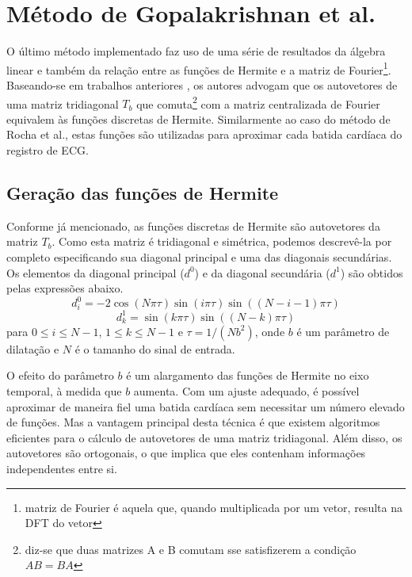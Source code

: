 
\section{Método de Gopalakrishnan et al.}
\label{sec:section4}
O último método implementado faz uso de uma série de resultados da álgebra linear e também da relação entre as funções de Hermite e a matriz de Fourier\footnote{matriz de Fourier é aquela que, quando multiplicada por um vetor, resulta na DFT do vetor}. Baseando-se em trabalhos anteriores \cite{Mugler02}, os autores advogam que os autovetores de uma matriz tridiagonal $T_b$ que comuta\footnote{diz-se que duas matrizes A e B comutam sse satisfizerem a condição $AB = BA$} com a matriz centralizada de Fourier equivalem às funções discretas de Hermite. Similarmente ao caso do método de Rocha et al., estas funções são utilizadas para aproximar cada batida cardíaca do registro de ECG.

\subsection{Geração das funções de Hermite}
Conforme já mencionado, as funções discretas de Hermite são autovetores da matriz $T_b$. Como esta matriz é tridiagonal e simétrica, podemos descrevê-la por completo especificando sua diagonal principal e uma das diagonais secundárias. Os elementos da diagonal principal ($d^0$) e da diagonal secundária ($d^1$) são obtidos pelas expressões abaixo.
\begin{equation} \label{equ:main_diagonal}
    d^0_{i} = -2\cos(N\pi\tau)\sin(i\pi\tau)\sin((N-i-1)\pi\tau)
\end{equation}
\begin{equation} \label{equ:off_diagonal}
    d^1_{k} = \sin(k\pi\tau)\sin((N-k)\pi\tau)
\end{equation}
para $0\leq i\leq N-1$, $1\leq k\leq N-1$ e $\tau = 1/(Nb^2)$, onde $b$ é um parâmetro de dilatação e $N$ é o tamanho do sinal de entrada.

O efeito do parâmetro $b$ é um alargamento das funções de Hermite no eixo temporal, à medida que $b$ aumenta. Com um ajuste adequado, é possível aproximar de maneira fiel uma batida cardíaca sem necessitar um número elevado de funções. Mas a vantagem principal desta técnica é que existem algoritmos eficientes para o cálculo de autovetores de uma matriz tridiagonal. Além disso, os autovetores são ortogonais, o que implica que eles contenham informações independentes entre si.

